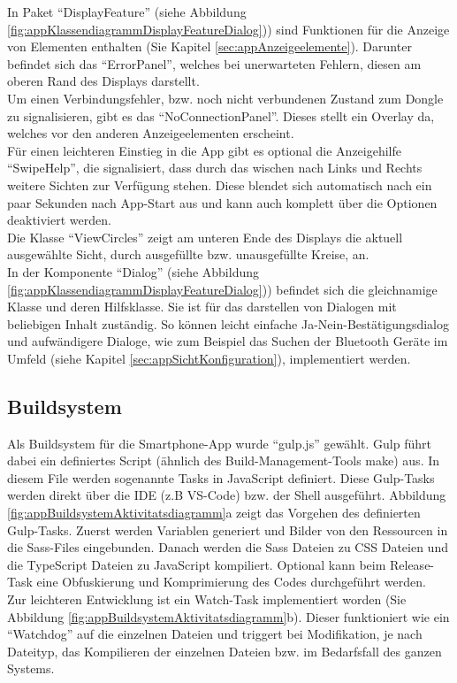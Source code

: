 In Paket \enquote{DisplayFeature} (siehe Abbildung \ref{fig:appKlassendiagrammDisplayFeatureDialog})) sind Funktionen für die Anzeige von Elementen enthalten (Sie Kapitel \ref{sec:appAnzeigeelemente}). Darunter befindet sich das \enquote{ErrorPanel}, welches bei unerwarteten Fehlern, diesen am oberen Rand des Displays darstellt. 
\\
Um einen Verbindungsfehler, bzw. noch nicht verbundenen Zustand zum Dongle zu signalisieren, gibt es das \enquote{NoConnectionPanel}. Dieses stellt ein Overlay da, welches vor den anderen Anzeigeelementen erscheint.
\\
Für einen leichteren Einstieg in die App gibt es optional die Anzeigehilfe \enquote{SwipeHelp}, die signalisiert, dass durch das wischen nach Links und Rechts weitere Sichten zur Verfügung stehen. Diese blendet sich automatisch nach ein paar Sekunden nach App-Start aus und kann auch komplett über die Optionen deaktiviert werden.
\\
Die Klasse \enquote{ViewCircles} zeigt am unteren Ende des Displays die aktuell ausgewählte Sicht, durch ausgefüllte bzw. unausgefüllte Kreise, an.
\\
In der Komponente \enquote{Dialog} (siehe Abbildung \ref{fig:appKlassendiagrammDisplayFeatureDialog})) befindet sich die gleichnamige Klasse und deren Hilfsklasse. Sie ist für das darstellen von Dialogen mit beliebigen Inhalt zuständig. So können leicht einfache Ja-Nein-Bestätigungsdialog und aufwändigere Dialoge, wie zum Beispiel das Suchen der Bluetooth Geräte im Umfeld (siehe Kapitel \ref{sec:appSichtKonfiguration}), implementiert werden.

\subsection{Buildsystem}

Als Buildsystem für die Smartphone-App wurde \enquote{gulp.js} gewählt. Gulp führt dabei ein definiertes Script (ähnlich des Build-Management-Tools make) aus. In diesem File werden sogenannte Tasks in JavaScript definiert. Diese Gulp-Tasks werden direkt über die IDE (z.B VS-Code) bzw. der Shell ausgeführt. Abbildung \ref{fig:appBuildsystemAktivitatsdiagramm}a zeigt das Vorgehen des definierten Gulp-Tasks. Zuerst werden Variablen generiert und Bilder von den Ressourcen in die Sass-Files eingebunden. Danach werden die Sass Dateien zu CSS Dateien und die TypeScript Dateien zu JavaScript kompiliert. Optional kann beim Release-Task eine Obfuskierung und Komprimierung des Codes durchgeführt werden.
\\
Zur leichteren Entwicklung ist ein Watch-Task implementiert worden (Sie Abbildung \ref{fig:appBuildsystemAktivitatsdiagramm}b). Dieser funktioniert wie ein \enquote{Watchdog} auf die einzelnen Dateien und triggert bei Modifikation, je nach Dateityp, das Kompilieren der einzelnen Dateien bzw. im Bedarfsfall des ganzen Systems.

